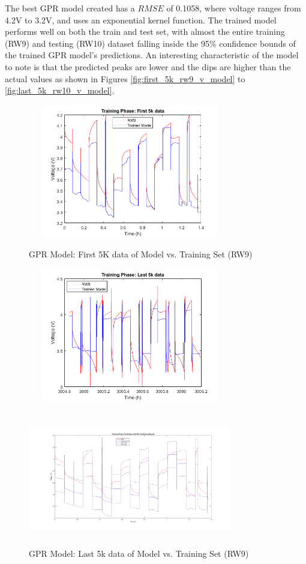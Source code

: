 The best GPR model created has a $RMSE$ of 0.1058, where voltage ranges from 4.2V to 3.2V, and uses an exponential kernel function.  The trained model performs well on both the train and test set, with almost the entire training (RW9) and testing (RW10) dataset falling inside the 95\% confidence bounds of the trained GPR model’s predictions.  An interesting characteristic of the model to note is that the predicted peaks are lower and the dips are higher than the actual values as shown in Figures \ref{fig:first_5k_rw9_v_model} to \ref{fig:last_5k_rw10_v_model}.
\begin{figure}
\begin{multicols}{2}
	\includegraphics[height=2.3in, width=3.5in]{figures/GPR/first_5k_rw9_v_model}
	\caption{GPR Model: First 5K data of Model vs. Training Set (RW9)}
	\label{fig:first_5k_rw9_v_model}
	\includegraphics[height=2.3in, width=3.5in]{figures/GPR/last_5k_rw9_v_model}
	\caption{GPR Model: Last 5k data of Model vs. Training Set (RW9)}
	\label{fig:last_5k_rw9_v_model}
\end{multicols}
\begin{multicols}{2}
	\includegraphics[height=2.3in, width=3.5in]{figures/GPR/first_5k_rw9_v_model_w_bounds}

\end{multicols}
\end{figure}
